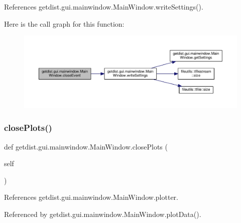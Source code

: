 References getdist.\+gui.\+mainwindow.\+Main\+Window.\+write\+Settings().

Here is the call graph for this function\+:
\nopagebreak
\begin{figure}[H]
\begin{center}
\leavevmode
\includegraphics[width=350pt]{classgetdist_1_1gui_1_1mainwindow_1_1MainWindow_aeb3af901563e3a12835412c7c44e9e7c_cgraph}
\end{center}
\end{figure}
\mbox{\label{classgetdist_1_1gui_1_1mainwindow_1_1MainWindow_a149bcf1e24828e673910fe008a7e458d}} 
\subsubsection{\texorpdfstring{close\+Plots()}{closePlots()}}
{\footnotesize\ttfamily def getdist.\+gui.\+mainwindow.\+Main\+Window.\+close\+Plots (\begin{DoxyParamCaption}\item[{}]{self }\end{DoxyParamCaption})}



References getdist.\+gui.\+mainwindow.\+Main\+Window.\+plotter.



Referenced by getdist.\+gui.\+mainwindow.\+Main\+Window.\+plot\+Data().

